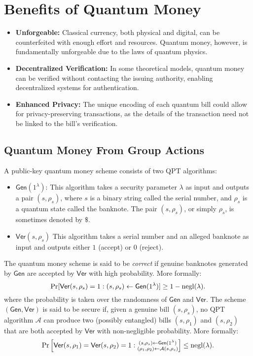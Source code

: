 \documentclass[11pt]{article}
\theoremstyle{definition}
\newcommand{\gen}{\mathsf{Gen}}
\newcommand{\ver}{\mathsf{Ver}}
\begin{document}
\section*{Benefits of Quantum Money}
\begin{itemize}
    \item \textbf{Unforgeable:} Classical currency, both physical and digital, can be counterfeited with enough effort and resources. Quantum money, however, is fundamentally unforgeable due to the laws of quantum physics.
    \item \textbf{Decentralized Verification:} In some theoretical models, quantum money can be verified without contacting the issuing authority, enabling decentralized systems for authentication.
    \item \textbf{Enhanced Privacy:} The unique encoding of each quantum bill could allow for privacy-preserving transactions, as the details of the transaction need not be linked to the bill's verification.
\end{itemize}



\subsection{Quantum Money From Group Actions}
A public-key quantum money scheme consists of two QPT algorithms: 
\begin{itemize}
\item $\gen(1^\lambda)$: This algorithm takes a security parameter $\lambda$ as input and outputs a pair $(s, \rho_s)$, where $s$ is a binary string called the serial number, and $\rho_s$ is a quantum state called the banknote. The pair $(s, \rho_s)$, or simply $\rho_s$, is sometimes denoted by $\$$.
\item $\ver(s, \rho_s)$ This algorithm takes a serial number and an alleged banknote as input and outputs either $1$ (accept) or $0$ (reject).
\end{itemize}

The quantum money scheme is said to be \textit{correct} if genuine banknotes generated by $\gen$ are accepted by $\ver$ with high probability. More formally:
\[ \Pr[\ver(s, \rho_s) = 1 : (s, \rho_s) \gets \gen(1^\lambda)] \ge 1 - \negl(\lambda). \]
where the probability is taken over the randomness of $\gen$ and $\ver$. The scheme $(\gen, \ver)$ is said to be secure if, given a genuine bill $(s, \rho_s)$, no QPT algorithm $\mathcal{A}$ can produce two (possibly entangled) bills $(s, \rho_1)$ and $(s, \rho_2)$ that are both accepted by $\ver$ with non-negligible probability. More formally:
\[ \Pr\left[ \ver(s, \rho_1) = \ver(s, \rho_2) = 1 : \substack{(s, \rho_s) \gets \gen(1^\lambda) \\ (\rho_1, \rho_2) \gets \mathcal{A}(s, \rho_s)} \right] \le \negl(\lambda). \]
\end{document}
